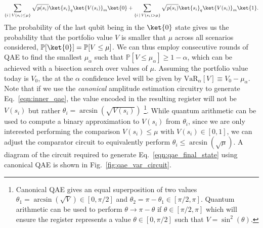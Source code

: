 \begin{enumerate}
\begin{equation}
	\label{eqn:qae_final_state}
	\sum_{\{i  \: | \: V(s_i) \le \mu\}}\sqrt{p(s_i)}\ket{s_i}_q\ket{V(s_i)}_m\ket{0} + \sum_{\{i  \: | \: V(s_i) > \mu\}}\sqrt{p(s_i)}\ket{s_i}_q\ket{V(s_i)}_m\ket{1}.
\end{equation}
The probability of the last qubit being in the $\ket{0}$ state gives us the probability that the portfolio value $V$ is smaller that $\mu$ across all scenarios considered, $\mathbb{P}[\ket{0}]=\mathbb{P}[V \le \mu]$.
We can thus employ consecutive rounds of QAE to find the smallest $\mu_{\alpha}$ such that $\mathbb{P}[V \le \mu_{\alpha}] \ge 1-\alpha$, which can be achieved with a bisection search over values of $\mu$.
Assuming the portfolio value today is $V_0$, the \var{} at the $\alpha$ confidence level will be given by $\textrm{VaR}_{\alpha}[V] \equiv V_0 - \mu_{\alpha}$.
Note that if we use the \emph{canonical} amplitude estimation \cite{brassard2002quantum} circuitry to generate Eq.~\eqref{eqn:inner_qae}, the value encoded in the resulting register will not be $V(s_i)$ but rather $\theta_i = \arcsin(\sqrt{V(s_i)})$ \footnote{Canonical QAE gives an equal superposition of two values $\theta_1 = \arcsin(\sqrt{V}) \in [0, \pi/2]$ and $\theta_2 = \pi - \theta_1 \in [\pi/2, \pi]$. Quantum arithmetic can be used to perform $\theta \rightarrow \pi - \theta$ if $\theta \in [\pi/2, \pi]$ which will ensure the register represents a value $\theta \in [0, \pi/2]$ such that $V = \sin^2(\theta)$.}.
While quantum arithmetic can be used to compute a binary approximation to $V(s_i)$ from $\theta_i$, since we are only interested performing the comparison $V(s_i) \le \mu$ with $V(s_i) \in [0,1]$, we can adjust the comparator circuit to equivalently perform $\theta_i \le \arcsin(\sqrt{\mu})$.
A diagram of the circuit required to generate Eq.~\eqref{eqn:qae_final_state} using canonical QAE is shown in Fig.~\ref{fig:qae_var_circuit}.


\end{enumerate}
